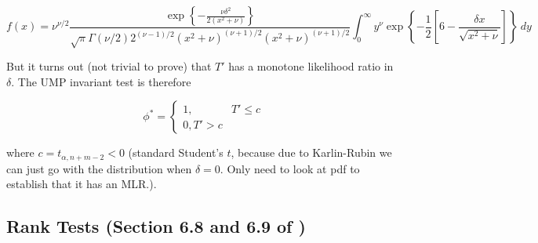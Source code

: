 \begin{example}
\[
f(x) = \nu^{\nu/2} \frac{ \exp \left\{ - \frac{\nu \delta^2}{2(x^2 + \nu)} \right\}}{\sqrt{\pi} \Gamma(\nu/2) 2^{(\nu-1)/2} (x^2 + \nu)^{(\nu+1)/2} (x^2 + \nu)^{(\nu+1)/2}} \int_0^\infty y^\nu \exp \left\{ - \frac{1}{2} \left[ 6 - \frac{\delta x}{\sqrt{x^2 + \nu}} \right] \right\} \ dy
\]

 But it turns out (not trivial to prove) that \(T'\) has a monotone likelihood ratio in \(\delta\). The UMP invariant test is therefore
 
 \[
 \phi^* = \begin{cases}
 1, & T' \leq c \\
 0, T' > c
 \end{cases}
 \]
 
 where \(c = t_{\alpha, n+m-2} < 0\) (standard Student's \(t\), because due to Karlin-Rubin we can just go with the distribution when \(\delta =0\). Only need to look at pdf to establish that it has an MLR.).

\end{example}

\subsection{Rank Tests (Section 6.8 and 6.9 of \citet{lehmann2005testing})} 

